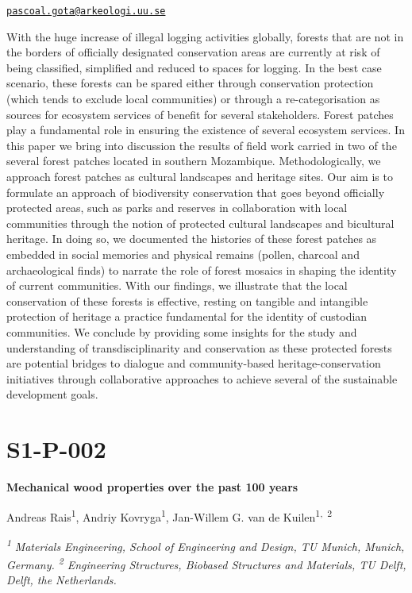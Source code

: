 \documentclass[
]{book}
\begin{document}
\href{mailto:pascoal.gota@arkeologi.uu.se}{\nolinkurl{pascoal.gota@arkeologi.uu.se}}

With the huge increase of illegal logging activities globally, forests that are not in the borders of officially designated conservation areas are currently at risk of being classified, simplified and reduced to spaces for logging. In the best case scenario, these forests can be spared either through conservation protection (which tends to exclude local communities) or through a re-categorisation as sources for ecosystem services of benefit for several stakeholders. Forest patches play a fundamental role in ensuring the existence of several ecosystem services. In this paper we bring into discussion the results of field work carried in two of the several forest patches located in southern Mozambique. Methodologically, we approach forest patches as cultural landscapes and heritage sites. Our aim is to formulate an approach of biodiversity conservation that goes beyond officially protected areas, such as parks and reserves in collaboration with local communities through the notion of protected cultural landscapes and bicultural heritage. In doing so, we documented the histories of these forest patches as embedded in social memories and physical remains (pollen, charcoal and archaeological finds) to narrate the role of forest mosaics in shaping the identity of current communities. With our findings, we illustrate that the local conservation of these forests is effective, resting on tangible and intangible protection of heritage a practice fundamental for the identity of custodian communities. We conclude by providing some insights for the study and understanding of transdisciplinarity and conservation as these protected forests are potential bridges to dialogue and community-based heritage-conservation initiatives through collaborative approaches to achieve several of the sustainable development goals.

\hypertarget{s1-p-002}{%
\section*{S1-P-002}\label{s1-p-002}}

\textbf{Mechanical wood properties over the past 100 years}

Andreas Rais\textsuperscript{1}, Andriy Kovryga\textsuperscript{1}, Jan-Willem G. van de Kuilen\textsuperscript{1,~2}

\textsuperscript{\emph{1}} \emph{Materials Engineering, School of Engineering and Design, TU Munich, Munich, Germany. \textsuperscript{2} Engineering Structures, Biobased Structures and Materials, TU Delft, Delft, the Netherlands.}
\end{document}
